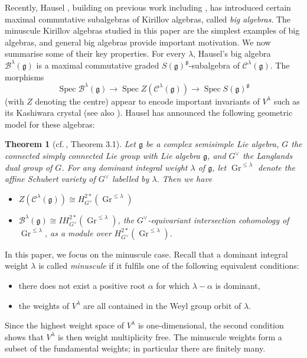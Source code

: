 \documentclass{amsart}
\newcommand{\cf}{cf.\,}
\newcommand{\B}{\mathcal{B}}
\newcommand{\Kir}{\mathcal{C}}
\newcommand{\g}{\mathfrak{g}}
\newcommand{\Gr}{\operatorname{Gr}}
\newcommand{\Spec}{\operatorname{Spec}}
\theoremstyle{definition}
\theoremstyle{plain}
\newtheorem{thm}[defn]{Theorem}
\theoremstyle{remark}
\begin{document}
Recently, Hausel \cite{Hausel2024_avatars}, building on previous work including \cite{Rybnikov2006_argument_shift, FFR2010_irregular_singularity}, has introduced certain maximal commutative subalgebras of Kirillov algebras, called \emph{big algebras}. The minuscule Kirillov algebras studied in this paper are the simplest examples of big algebras, and general big algebras provide important motivation. We now summarise some of their key properties. For every $\lambda$, Hausel's big algebra $\B^\lambda(\g)$ is a maximal commutative graded $S(\g)^\g$-subalgebra of $\Kir^\lambda(\g)$. The morphisms
$$
    \Spec \B^\lambda(\g)
    \to
    \Spec Z(\Kir^\lambda(\g))
    \to
    \Spec S(\g)^\g
$$
(with $Z$ denoting the centre) appear to encode important invariants of $V^\lambda$ such as its Kashiwara crystal \cite[final slide]{Hausel2024_StonyBrook} (see also \cite{HKRW2020_crystals}). Hausel has announced the following geometric model for these algebras:
\begin{thm}[\cf \cite{Hausel2024_avatars}, Theorem 3.1]
\label{thm:geom_model}
    Let $\g$ be a complex semisimple Lie algebra, $G$ the connected simply connected Lie group with Lie algebra $\g$, and $G^\vee$ the Langlands dual group of $G$. For any dominant integral weight $\lambda$ of $\g$, let $\Gr^{\le\lambda}$ denote the affine Schubert variety of $G^\vee$ labelled by $\lambda$. Then we have 
    \begin{itemize}
        \item[(i)] $Z(\Kir^\lambda(\g)) \cong H^{2*}_{G^\vee}(\Gr^{\le\lambda})$
        \item[(ii)] $\B^\lambda(\g) \cong IH^{2*}_{G^\vee}(\Gr^{\le\lambda})$, the $G^\vee$-equivariant intersection cohomology of $\Gr^{\le\lambda}$, as a module over $H^{2*}_{G^\vee}(\Gr^{\le\lambda})$. 
    \end{itemize}
\end{thm}

In this paper, we focus on the minuscule case. Recall that a dominant integral weight $\lambda$ is called \emph{minuscule} if it fulfils one of the following equivalent conditions:
\begin{itemize}
    \item there does not exist a positive root $\alpha$ for which $\lambda - \alpha$ is dominant,
    \item the weights of $V^\lambda$ are all contained in the Weyl group orbit of $\lambda$.
\end{itemize}
Since the highest weight space of $V^\lambda$ is one-dimensional, the second condition shows that $V^\lambda$ is then weight multiplicity free. The minuscule weights form a subset of the fundamental weights; in particular there are finitely many.
\end{document}

